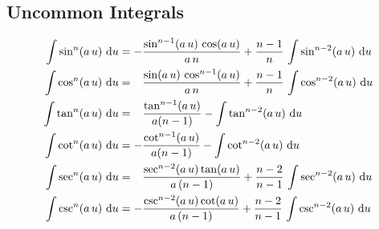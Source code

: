 \documentclass["AM3C-Slides_annotations.tex"]{subfiles}
\begin{document}
\begin{sectionBox}
  \subsection*{Uncommon Integrals}
  \begin{align}
    \int{\sin^n(a\,u)\,\odif{u}}
    &= 
    - \frac
    { \sin^{n-1}(a\,u)\,\cos(a\,u)}
    {a\,n}
    + \frac{n-1}{n}
    \,\int{\sin^{n-2}(a\,u)\,\odif{u}}
    \\
    \int{\cos^n(a\,u)\,\odif{u}}
    &= \phantom{-} 
    \frac
    { \sin(a\,u)\,\cos^{n-1}(a\,u)}
    {a\,n}
    +\frac{n-1}{n}
    \,\int{\cos^{n-2}(a\,u)\,\odif{u}}
    \\
    \int{\tan^n(a\,u)\,\odif{u}}
    &= \phantom{-} 
    \frac
    { \tan^{n-1}(a\,u) }
    {a(n-1)}
    -\int{\tan^{n-2}(a\,u)\,\odif{u}}
    \\
    \int{\cot^n(a\,u)\,\odif{u}}
    &=
    - \frac
    {\cot^{n-1}(a\,u)}
    {a(n-1)}
    -\int{\cot^{n-2}(a\,u)\,\odif{u}}
    \\
    \int{\sec^n(a\,u)\,\odif{u}}
    &= \phantom{-}
    \frac
    {\sec^{n-2}(a\,u) \tan(a\,u)}
    {a\,(n-1)}
    + \frac{n-2}{n-1}
    \,\int{\sec^{n-2}(a\,u)\,\odif{u}}
    \\
    \int{\csc^n(a\,u)\,\odif{u}}
    &=
    - \frac
    {\csc^{n-2}(a\,u) \cot(a\,u)}
    {a\,(n-1)}
    + \frac{n-2}{n-1}
    \,\int{\csc^{n-2}(a\,u)\,\odif{u}}
  \end{align}
\end{sectionBox}
\end{document}
